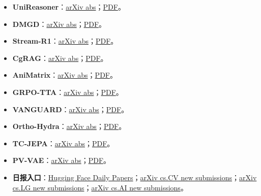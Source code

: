\begin{itemize}[leftmargin=1.5em]
  \item \textbf{UniReasoner}：\href{https://arxiv.org/abs/2605.04040}{arXiv abs}；\href{https://arxiv.org/pdf/2605.04040}{PDF}。
  \item \textbf{DMGD}：\href{https://arxiv.org/abs/2605.03877}{arXiv abs}；\href{https://arxiv.org/pdf/2605.03877}{PDF}。
  \item \textbf{Stream-R1}：\href{https://arxiv.org/abs/2605.03849}{arXiv abs}；\href{https://arxiv.org/pdf/2605.03849}{PDF}。
  \item \textbf{CgRAG}：\href{https://arxiv.org/abs/2605.03790}{arXiv abs}；\href{https://arxiv.org/pdf/2605.03790}{PDF}。
  \item \textbf{AniMatrix}：\href{https://arxiv.org/abs/2605.03652}{arXiv abs}；\href{https://arxiv.org/pdf/2605.03652}{PDF}。
  \item \textbf{GRPO-TTA}：\href{https://arxiv.org/abs/2605.03403}{arXiv abs}；\href{https://arxiv.org/pdf/2605.03403}{PDF}。
  \item \textbf{VANGUARD}：\href{https://arxiv.org/abs/2605.02912}{arXiv abs}；\href{https://arxiv.org/pdf/2605.02912}{PDF}。
  \item \textbf{Ortho-Hydra}：\href{https://arxiv.org/abs/2605.03252}{arXiv abs}；\href{https://arxiv.org/pdf/2605.03252}{PDF}。
  \item \textbf{TC-JEPA}：\href{https://arxiv.org/abs/2605.03245}{arXiv abs}；\href{https://arxiv.org/pdf/2605.03245}{PDF}。
  \item \textbf{PV-VAE}：\href{https://arxiv.org/abs/2605.02134}{arXiv abs}；\href{https://arxiv.org/pdf/2605.02134}{PDF}。
  \item \textbf{日报入口}：\href{https://huggingface.co/papers}{Hugging Face Daily Papers}；\href{https://arxiv.org/list/cs.CV/new}{arXiv cs.CV new submissions}；\href{https://arxiv.org/list/cs.LG/new}{arXiv cs.LG new submissions}；\href{https://arxiv.org/list/cs.AI/new}{arXiv cs.AI new submissions}。
\end{itemize}
